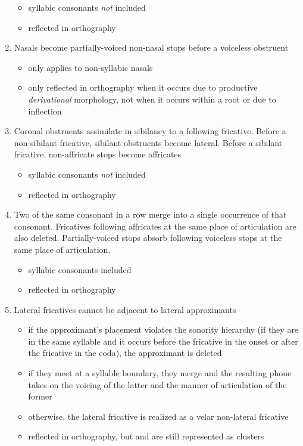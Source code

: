 \documentclass[a4paper,11pt,oneside,openany]{memoir}
\begin{document}
\begin{enumerate}
    \begin{itemize}
        \item syllabic consonants \emph{not} included
        \item reflected in orthography
    \end{itemize}
    \item Nasals become partially-voiced non-nasal stops before a voiceless obstruent
    \begin{itemize}
        \item only applies to non-syllabic nasals
        \item only reflected in orthography when it occurs due to productive \emph{derivational} morphology, not when it occurs within a root or due to inflection
    \end{itemize}
    \item Coronal obstruents assimilate in sibilancy to a following fricative. Before a non-sibilant fricative, sibilant obstruents become lateral. Before a sibilant fricative, non-affricate stops become affricates
    \begin{itemize}
        \item syllabic consonants \emph{not} included
        \item reflected in orthography
    \end{itemize}
    \item Two of the same consonant in a row merge into a single occurrence of that consonant. Fricatives following affricates at the same place of articulation are also deleted. Partially-voiced stops absorb following voiceless stops at the same place of articulation.
    \begin{itemize}
        \item syllabic consonants included
        \item reflected in orthography
    \end{itemize}
    \item Lateral fricatives cannot be adjacent to lateral approximants
    \begin{itemize}
        \item if the approximant's placement violates the sonority hierarchy (if they are in the same syllable and it occurs before the fricative in the onset or after the fricative in the coda), the approximant is deleted
        \item if they meet at a syllable boundary, they merge and the resulting phone takes on the voicing of the latter and the manner of articulation of the former
        \item otherwise, the lateral fricative is realized as a velar non-lateral fricative
        \item reflected in orthography, but \bripa{\latfrivoic} and  are still represented as clusters
    \end{itemize}
\end{enumerate}
\end{document}
